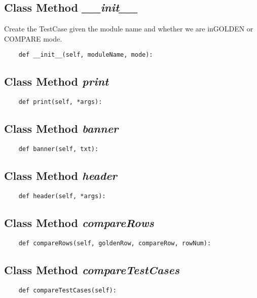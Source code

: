 \documentclass[twoside,11pt]{book}
\begin{document}
\subsection{Class Method {\it \_\_init\_\_}}
Create the TestCase given the module name and whether we are inGOLDEN or COMPARE mode. 

\begin{lstlisting}
    def __init__(self, moduleName, mode):
\end{lstlisting}

\subsection{Class Method {\it print}}


\begin{lstlisting}
    def print(self, *args):
\end{lstlisting}

\subsection{Class Method {\it banner}}


\begin{lstlisting}
    def banner(self, txt):
\end{lstlisting}

\subsection{Class Method {\it header}}


\begin{lstlisting}
    def header(self, *args):
\end{lstlisting}

\subsection{Class Method {\it compareRows}}


\begin{lstlisting}
    def compareRows(self, goldenRow, compareRow, rowNum):
\end{lstlisting}

\subsection{Class Method {\it compareTestCases}}


\begin{lstlisting}
    def compareTestCases(self):
\end{lstlisting}
\end{document}
